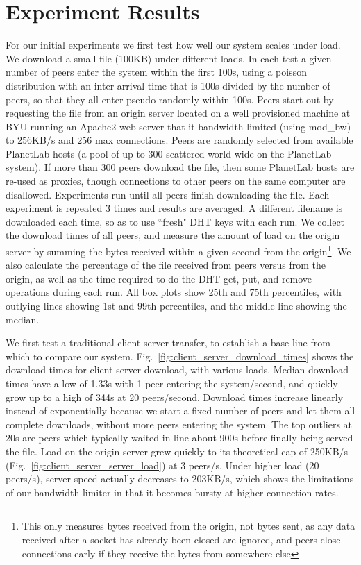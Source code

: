
\section{Experiment Results}
For our initial experiments we first test how well our system scales under load. We download a small file (100KB) 
under different loads. In each test a given number of peers enter the system within 
the first 100s, using a poisson distribution with an inter arrival time that is 100s divided by the number of peers, 
so that they all enter pseudo-randomly within 100s. Peers start out by requesting the file from 
an origin server located on a well provisioned machine at BYU running an Apache2 web server that it 
bandwidth limited (using mod\_bw) to 256KB/s and 256 max connections. Peers are randomly selected from available PlanetLab 
hosts (a pool of up to 300 scattered world-wide on the PlanetLab system).  If more than 300 peers download the file,
then some PlanetLab hosts are re-used as proxies, though connections to other peers on the same computer
are disallowed.  Experiments run until 
all peers finish downloading the file. Each experiment is repeated 3 times and results are averaged. 
A different filename is downloaded each time, so as to use ``fresh" DHT keys with each run. We collect the download 
times of all peers, and measure the amount of load on the origin server by summing the bytes received within a given 
second from the origin\footnote{This only measures bytes received from the origin, not bytes sent, 
as any data received after a socket has already been closed are ignored, and peers 
close connections early if they receive the bytes from somewhere else}. We also calculate the percentage 
of the file received from peers versus from the origin, as well as the time required to do the DHT 
get, put, and remove operations during each run.  All box plots show 25th and 75th percentiles, with outlying lines showing
1st and 99th percentiles, and the middle-line showing the median.

We first test a traditional client-server transfer, to establish a base line from which to compare 
our system. Fig.~\ref{fig:client_server_download_times} shows the download times for client-server 
download, with various loads. Median download times have a low of 1.33s with 1 peer entering the system/second, 
and quickly grow up to a high of 344s at 20 peers/second. Download times increase linearly instead 
of exponentially because we start a fixed number of peers and let them all complete downloads, without more peers
entering the system. 
The top outliers at 20s are peers which typically waited in line about 900s before finally 
being served the file. Load on the origin server grew quickly to its theoretical cap of 250KB/s (Fig.~\ref{fig:client_server_server_load}) 
at 3 peers/s. Under higher load (20 peers/s), server speed actually decreases to 203KB/s, which 
shows the limitations of our bandwidth limiter in that it becomes bursty at higher connection rates. 

